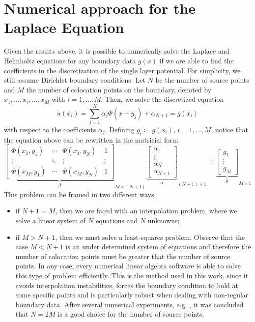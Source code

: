 \section{Numerical approach for the Laplace Equation}\label{n_a_mfs_lap}
Given the results above, it is possible to numerically solve the Laplace and Helmholtz equations for any boundary data \(g(x)\) if we are able to find the coefficients in the discretization of the single layer potential. For simplicity, we still assume Dirichlet boundary conditions. Let \(N\) be the number of source points and \(M\) the number of colocation points on the boundary, denoted by \(x_1,\dots,x_i,\dots,x_M\) with \(i=1,\dots,M\). Then, we solve the discretized equation
\[
    \tilde{u}(x_i) = \sum_{j=1}^{N} \alpha_j \Phi(x-y_j) + \alpha_{N+1} = g(x_i)    
\]
with respect to the coefficients \(\alpha_j\). Defining \(g_i \coloneq g(x_i), \, i=1,\dots,M\), notice that the equation above can be rewritten in the matricial form
\begin{equation}\label{mfs_m_system}
    {\underbrace{\begin{bmatrix}
        \Phi(x_1, y_1) & \cdots & \Phi(x_1, y_N) & 1 \\
        \vdots & \ddots & \vdots & \vdots\\
        \Phi(x_M, y_1) & \cdots & \Phi(x_M, y_N) & 1
    \end{bmatrix}}_{A}}_{M\times (N+1)}
    {\underbrace{\begin{bmatrix}
        \alpha_1\\
        \vdots\\
        \alpha_N\\
        \alpha_{N+1}
    \end{bmatrix}}_\alpha}_{(N+1)\times 1}
    =
    {\underbrace{\begin{bmatrix}
        g_1\\
        \vdots\\
        g_M
    \end{bmatrix}}_g}_{M\times 1}
\end{equation}
This problem can be framed in two different ways:
\begin{itemize}
    \item if \(N+1=M\), then we are faced with an interpolation problem, where we solve a linear system of \(N\) equations and \(N\) unknowns;
    \item if \(M > N+1\), then we must solve a least-squares problem. Observe that the case \(M < N+1\) is an under determined system of equations and therefore the number of colocation points must be greater that the number of source points. In any case, every numerical linear algebra software is able to solve this type of problem efficiently. This is the method used in this work, since it avoids interpolation instabilities, forces the boundary condition to hold at some specific points and is particularly robust when dealing with non-regular boundary data.  After several numerical experiments, e.g. \cite{alves2009choice}, it was concluded that \(N=2M\) is a good choice for the number of source points.
\end{itemize}


